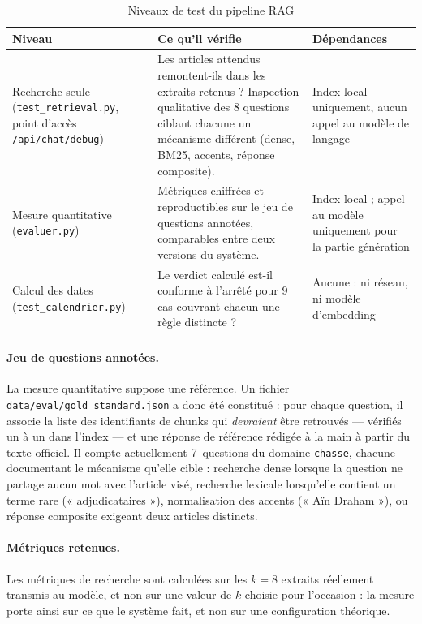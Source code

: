 \begin{table}[h]
\centering
\caption{Niveaux de test du pipeline RAG}
\label{tab:niveaux-test}
\begin{tabular}{|p{4.1cm}|p{5.4cm}|p{4.1cm}|}
\hline
\textbf{Niveau} & \textbf{Ce qu'il vérifie} & \textbf{Dépendances} \\
\hline
Recherche seule \newline (\texttt{test\_retrieval.py},
point d'accès \texttt{/api/chat/debug})
& Les articles attendus remontent-ils dans les extraits retenus ?
Inspection qualitative des 8 questions ciblant chacune un mécanisme différent
(dense, BM25, accents, réponse composite).
& Index local uniquement, aucun appel au modèle de langage \\
\hline
Mesure quantitative \newline (\texttt{evaluer.py})
& Métriques chiffrées et reproductibles sur le jeu de questions annotées,
comparables entre deux versions du système.
& Index local ; appel au modèle uniquement pour la partie génération \\
\hline
Calcul des dates \newline (\texttt{test\_calendrier.py})
& Le verdict calculé est-il conforme à l'arrêté pour 9 cas couvrant chacun
une règle distincte ?
& Aucune : ni réseau, ni modèle d'embedding \\
\hline
\end{tabular}
\end{table}

\paragraph{Jeu de questions annotées.}
La mesure quantitative suppose une référence. Un fichier
\texttt{data/eval/gold\_standard.json} a donc été constitué : pour chaque
question, il associe la liste des identifiants de chunks qui \emph{devraient}
être retrouvés — vérifiés un à un dans l'index — et une réponse de référence
rédigée à la main à partir du texte officiel. Il compte actuellement
7~questions du domaine \texttt{chasse}, chacune documentant le mécanisme
qu'elle cible : recherche dense lorsque la question ne partage aucun mot avec
l'article visé, recherche lexicale lorsqu'elle contient un terme rare
(« adjudicataires »), normalisation des accents (« Aïn Draham »), ou réponse
composite exigeant deux articles distincts.

\paragraph{Métriques retenues.}
Les métriques de recherche sont calculées sur les $k = 8$ extraits réellement
transmis au modèle, et non sur une valeur de $k$ choisie pour l'occasion : la
mesure porte ainsi sur ce que le système fait, et non sur une configuration
théorique.


